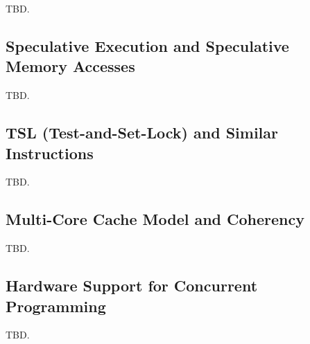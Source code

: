 TBD.


\subsection{Speculative Execution and Speculative Memory Accesses}
\label{scfp0:sses0}

TBD.


\subsection{TSL (Test-and-Set-Lock) and Similar Instructions}
\label{scfp0:stsl0}

TBD.


\subsection{Multi-Core Cache Model and Coherency}
\label{scfp0:smcc0}

TBD.


\subsection{Hardware Support for Concurrent Programming}
\label{scfp0:shsc0}

TBD.
